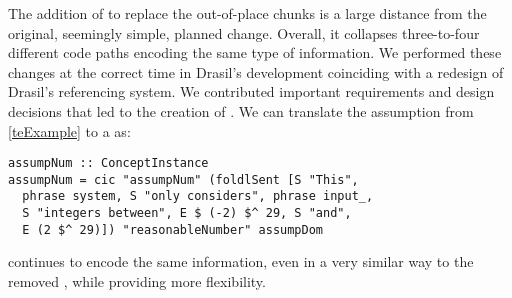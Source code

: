 %
%
%

The addition of  to replace the out-of-place chunks is a large distance from the original, seemingly simple, planned change. Overall, it collapses three-to-four different code paths encoding the same type of information. We performed these changes at the correct time in Drasil's development coinciding with a redesign of Drasil's referencing system. We contributed important requirements and design decisions that led to the creation of . We can translate the assumption from \autoref{teExample} to a  as:

\begin{tcolorbox}[breakable, toprule at break=0pt, bottomrule at break=0pt]
\begin{verbatim}
assumpNum :: ConceptInstance
assumpNum = cic "assumpNum" (foldlSent [S "This",
  phrase system, S "only considers", phrase input_,
  S "integers between", E $ (-2) $^ 29, S "and",
  E (2 $^ 29)]) "reasonableNumber" assumpDom
\end{verbatim}
\end{tcolorbox}

 continues to encode the same information, even in a very similar way to the removed , while providing more flexibility.

